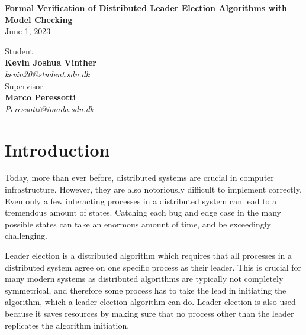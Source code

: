 \documentclass{report}
\begin{document}
\begin{center}
       \vspace*{1cm}
       \textbf{Formal Verification of Distributed Leader Election Algorithms with Model Checking}\\
       \vspace{0.4cm}
       June 1, 2023

       \vspace{0.5cm}

       \vspace{1.5cm}

       \begin{multicols}{2}
       Student\\
       \textbf{Kevin Joshua Vinther}\\
       \textit{kevin20@student.sdu.dk}
       \vspace{0.5cm}
       \\
       Supervisor\\
       \textbf{Marco Peressotti}\\
       \textit{Peressotti@imada.sdu.dk}
       \end{multicols}


       \vfill

       \vspace{0.8cm}

\end{center}
\newpage

\tableofcontents

\chapter{Introduction}


Today, more than ever before, distributed systems are crucial in computer infrastructure. However, they are also notoriously difficult to implement correctly. Even only a few interacting processes in a distributed system can lead to a tremendous amount of states. Catching each bug and edge case in the many possible states can take an enormous amount of time, and be exceedingly challenging.

Leader election is a distributed algorithm which requires that all processes in a distributed system agree on one specific process as their leader. This is crucial for many modern systems as distributed algorithms are typically not completely symmetrical, and therefore some process has to take the lead in initiating the algorithm, which a leader election algorithm can do. Leader election is also used because it saves resources by making sure that no process other than the leader replicates the algorithm initiation.
\end{document}
